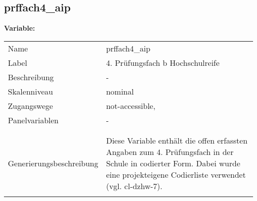 	
	
	\subsection{prffach4\_aip}
	\label{subSection:prffach4_aip}

	\noindent\textbf{Variable:}\\
		\begin{tabular}{lL{11.3cm}}
			\label{tableVariable:prffach4_aip}
			Name & prffach4\_aip \\
			Label & 4. Prüfungsfach b Hochschulreife \\
			Beschreibung & - \\
			Skalenniveau & nominal \\
			Zugangswege &
				not-accessible,
 \\
			Panelvariablen & -
			 \\
			 \\
 \\
					Generierungsbeschreibung & Diese Variable enthält die offen erfassten Angaben zum 4. Prüfungsfach in der Schule in codierter Form. Dabei wurde eine projekteigene Codierliste verwendet (vgl. cl-dzhw-7).
				 \\	
			 \\
		\end{tabular}






	
	\newpage
